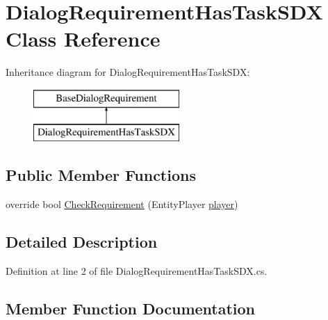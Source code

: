 \hypertarget{class_dialog_requirement_has_task_s_d_x}{}\section{Dialog\+Requirement\+Has\+Task\+S\+DX Class Reference}
\label{class_dialog_requirement_has_task_s_d_x}
Inheritance diagram for Dialog\+Requirement\+Has\+Task\+S\+DX\+:\begin{figure}[H]
\begin{center}
\leavevmode
\includegraphics[height=2.000000cm]{class_dialog_requirement_has_task_s_d_x}
\end{center}
\end{figure}
\subsection*{Public Member Functions}
\begin{DoxyCompactItemize}
\item 
override bool \mbox{\hyperlink{class_dialog_requirement_has_task_s_d_x_abf1f40228832a9cb7ed65bfef8c58b8b}{Check\+Requirement}} (Entity\+Player \mbox{\hyperlink{_sphere_i_i_01_music_01_boxes_2_config_2_localization_8txt_a4e2cb8aeff651600ea1cc57fe5a929a4}{player}})
\end{DoxyCompactItemize}


\subsection{Detailed Description}


Definition at line 2 of file Dialog\+Requirement\+Has\+Task\+S\+D\+X.\+cs.



\subsection{Member Function Documentation}
\mbox{\label{class_dialog_requirement_has_task_s_d_x_abf1f40228832a9cb7ed65bfef8c58b8b}} 
